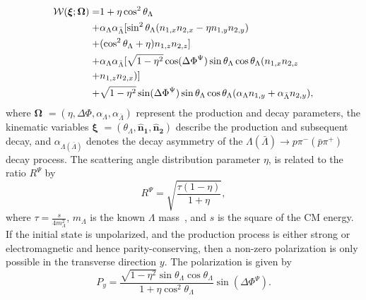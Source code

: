 \documentclass[a4paper,11pt]{article}
\begin{document}
\begin{align}
 \label{eq:tangles:abcd}
{\cal{W}}(\boldsymbol{\xi}; \boldsymbol{\Omega}) = & 1 + \eta\cos^{2}\theta_{\Lambda} \nonumber\\
+ &\alpha_{\Lambda}\alpha_{\bar\Lambda}[\sin^{2}\theta_{\Lambda}(n_{1, x}n_{2, x} -\eta n_{1, y}n_{2, y}) \nonumber \\
+ &(\cos^{2}\theta_{\Lambda} +\eta)n_{1, z}n_{2, z}] \\
+&\alpha_{\Lambda}\alpha_{\bar\Lambda}[\sqrt{1-\eta^{2}}\cos(\Delta\Phi^{\Psi})\sin\theta_{\Lambda}\cos\theta_{\Lambda}
(n_{1, x}n_{2, z} \nonumber \\
+ & n_{1, z}n_{2, x})]\nonumber \\
+ &\sqrt{1-\eta^{2}}\sin(\Delta\Phi^{\Psi})\sin\theta_{\Lambda}\cos\theta_{\Lambda}(\alpha_{\Lambda}n_{1, y} +\alpha_{\bar\Lambda}n_{2, y}), \nonumber
\end{align}
where 
$\boldsymbol{\Omega}$ 
$= (\eta, \Delta\Phi, \alpha_\Lambda, \alpha_{\bar\Lambda})$ 
represent the production and decay parameters, the kinematic variables 
$\boldsymbol{\xi}$ 
$= (\theta_{\Lambda}, \boldsymbol{\hat{n}_1}, \boldsymbol{\hat{n}_2})$ 
describe the production and subsequent decay, and
$\alpha_{\Lambda(\bar\Lambda)}$ denotes the decay asymmetry of the $\Lambda(\bar\Lambda)\to p\pi^{-}(\bar{p}\pi^{+})$ decay process. The scattering angle distribution parameter $\eta$, is related to the ratio $R^{\Psi}$ by
\begin{equation}%
R^{\Psi}=\sqrt{ \frac{\tau(1-\eta)}{1+\eta}},
\end{equation}
 where $\tau = \frac{s}{4m_{\Lambda}^2}$, $m_{\Lambda}$ is the known $\Lambda$ mass~\cite{PDG2020}, and $s$ is the square of the CM energy.
 If the initial state is unpolarized, and the production process is either strong or electromagnetic and hence parity-conserving, then a non-zero polarization is only possible in the transverse direction $y$. The polarization is given by
\begin{equation}
P_y=\frac{\sqrt{1-\eta^2}\sin\theta_{\Lambda}\cos\theta_{\Lambda}}{1+\eta\cos^2\theta_{\Lambda}}\sin(\Delta\Phi^{\Psi}).
\label{eq:pol}
\end{equation}
\end{document}
